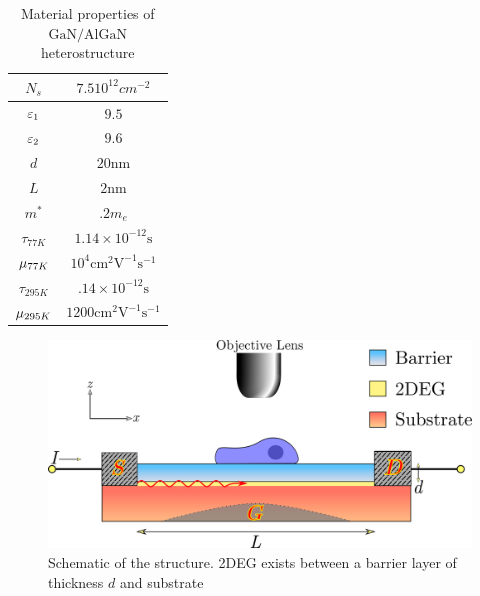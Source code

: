\documentclass[11pt]{article}
\begin{document}
\begin{table}[h]
  \renewcommand{\arraystretch}{1.3}
  \caption{Material properties of $\mathrm{GaN/AlGaN}$ heterostructure \cite{Muravjov_2010}}
  \label{table_example}
  \centering
  \begin{tabular}{c||c}
    \hline
    $N_s$ & $7.5 10^{12} cm^{-2}$\\ \hline
    $\varepsilon_{1}$ & $9.5$ \\  \hline
    $\varepsilon_2$ & $9.6$ \\  \hline
    $d$ & $20 \mathrm{nm}$ \\  \hline
    $L$ &  $2 \mathrm{nm}$ \\  \hline
    $m^{\ast}$ & $.2 m_e$ \\  \hline
    $\tau_{77 K}$ & $1.14 \times 10^{-12} \mathrm{s} $ \\  \hline
    $\mu_{77 K}$ & $10^4  \mathrm{cm^2 V^{-1} s^{-1}} $ \\  \hline
    $\tau_{295 K}$ & $.14 \times 10^{-12} \mathrm{s} $ \\  \hline
    $\mu_{295 K}$ & $1200  \mathrm{cm^2 V^{-1} s^{-1}} $ \\  \hline
  \end{tabular}
  \label{tab:data}
\end{table}

\begin{figure}[h!]
  \centering
  \includegraphics[scale=.5]{Microcopic_Structure.png}
  \caption{Schematic of the structure. 2DEG exists between a barrier layer of thickness $d$ and substrate}
  \label{fig:scheme}
\end{figure}
\end{document}
